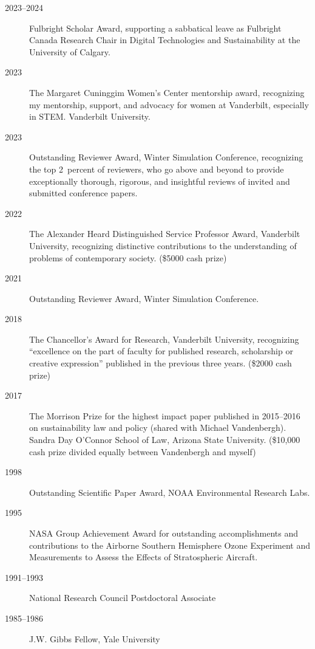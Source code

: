 \begin{description}
\item[2023--2024] Fulbright Scholar Award, supporting a sabbatical leave as
  Fulbright Canada Research Chair in Digital Technologies and Sustainability
  at the University of Calgary.
\item[2023] The Margaret Cuninggim Women's Center mentorship award, recognizing
  my mentorship, support, and advocacy for women at Vanderbilt, especially in
  STEM. Vanderbilt University.
\item[2023] Outstanding Reviewer Award, Winter Simulation Conference,
  recognizing the top 2~percent of reviewers, who go above and beyond to provide
  exceptionally thorough, rigorous, and insightful reviews of invited and
  submitted conference papers.
\item[2022] The Alexander Heard Distinguished Service Professor Award,
  Vanderbilt University, recognizing distinctive contributions to the
  understanding of problems of contemporary society.
  (\$5000 cash prize)
\item[2021] Outstanding Reviewer Award, Winter Simulation Conference.
\item[2018] The Chancellor's Award for Research, Vanderbilt University,
  recognizing ``excellence on the part of faculty for
  published research, scholarship or creative expression'' published in the
  previous three years.
  (\$2000 cash prize)
\item[2017] The Morrison Prize for the highest impact paper published in
  2015--2016 on sustainability law and policy (shared with Michael Vandenbergh).
  Sandra Day O'Connor School of Law, Arizona State University.
  (\$10,000 cash prize divided equally between Vandenbergh and myself)
\item[1998] Outstanding Scientific Paper Award, NOAA Environmental Research
  Labs.
\item[1995] NASA Group Achievement Award for outstanding accomplishments and
  contributions to the Airborne Southern Hemisphere Ozone Experiment and
  Measurements to Assess the Effects of Stratospheric Aircraft.
\item[1991--1993] National Research Council Postdoctoral Associate
\item[1985--1986] J.W. Gibbs Fellow, Yale University
\end{description}
